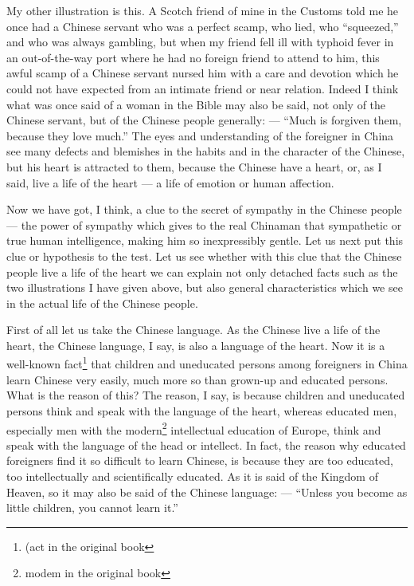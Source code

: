 My other illustration is this.
A Scotch friend of mine in the Customs told me he once had a Chinese servant who was a perfect scamp, who lied, who ``squeezed,'' and who was always gambling, but when my friend fell ill with typhoid fever in an out-of-the-way port where he had no foreign friend to attend to him, this awful scamp of a Chinese servant nursed him with a care and devotion which he could not have expected from an intimate friend or near relation.
Indeed I think what was once said of a woman in the Bible may also be said, not only of the Chinese servant, but of the Chinese people generally: --- ``Much is forgiven them, because they love much.''
The eyes and understanding of the foreigner in China see many defects and blemishes in the habits and in the character of the Chinese, but his heart is attracted to them, because the Chinese have a heart, or, as I said, live a life of the heart --- a life of emotion or human affection.

Now we have got, I think, a clue to the secret of sympathy in the Chinese people --- the power of sympathy which gives to the real Chinaman that sympathetic or true human intelligence, making him so inexpressibly gentle.
Let us next put this clue or hypothesis to the test.
Let us see whether with this clue that the Chinese people live a life of the heart we can explain not only detached facts such as the two illustrations I have given above, but also general characteristics which we see in the actual life of the Chinese people.

First of all let us take the Chinese language.
As the Chinese live a life of the heart, the Chinese language, I say, is also a language of the heart.
Now it is a well-known fact\footnote{(act in the original book} that children and uneducated persons among foreigners in China learn Chinese very easily, much more so than grown-up and educated persons.
What is the reason of this?
The reason, I say, is because children and uneducated persons think and speak with the language of the heart, whereas educated men, especially men with the modern\footnote{modem in the original book} intellectual education of Europe, think and speak with the language of the head or intellect.
In fact, the reason why educated foreigners find it so difficult to learn Chinese, is because they are too educated, too intellectually and scientifically educated.
As it is said of the Kingdom of Heaven,  so it may also be said of the Chinese language: --- ``Unless you become as little children, you cannot learn it.''

